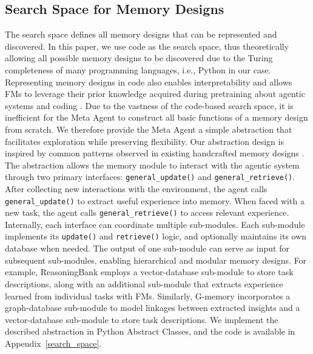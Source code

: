 \documentclass{article}
\theoremstyle{plain}
\theoremstyle{definition}
\theoremstyle{remark}
\begin{document}
\subsection{Search Space for Memory Designs} %
The search space defines all memory designs that can be represented and discovered. In this paper, we use code as the search space, thus theoretically allowing all possible memory designs to be discovered due to the Turing completeness of many programming languages, i.e., Python in our case.
Representing memory designs in code also enables interpretability and allows FMs to leverage their prior knowledge acquired during pretraining about agentic systems and coding \citep{hu2024ADAS}.
Due to the vastness of the code-based search space, it is inefficient for the Meta Agent to construct all basic functions of a memory design from scratch. 
We therefore provide the Meta Agent a simple abstraction that facilitates exploration while preserving flexibility. 
Our abstraction design is inspired by common patterns observed in existing handcrafted memory designs \citep{nan2025nemori, chhikara2025mem0, ouyang2025reasoningbank, zhang2025g, tang2025agent, suzgun2025DynamicCheatsheet}. The abstraction allows the memory module to interact with the agentic system through two primary interfaces: \texttt{general\_update()} and \texttt{general\_retrieve()}. After collecting new interactions with the environment, the agent calls \texttt{general\_update()} to extract useful experience into memory. When faced with a new task, the agent calls \texttt{general\_retrieve()} to access relevant experience. 
Internally, each interface can coordinate multiple sub-modules. 
Each sub-module implements its \texttt{update()} and \texttt{retrieve()} logic, 
and optionally maintains its own database when needed. The output of one sub-module can serve as input for subsequent sub-modules, enabling hierarchical and modular memory designs.
For example, ReasoningBank \citep{ouyang2025reasoningbank} employs a vector-database sub-module to store task descriptions, along with an additional sub-module that extracts experience learned from individual tasks with FMs. 
Similarly, G-memory \citep{zhang2025g} incorporates a graph-database sub-module to model linkages between extracted insights and a vector-database sub-module to store task descriptions. 
We implement the described abstraction in Python Abstract Classes, and the code is available in Appendix~\ref{search_space}.
\vspace{-0.5em}
\end{document}
